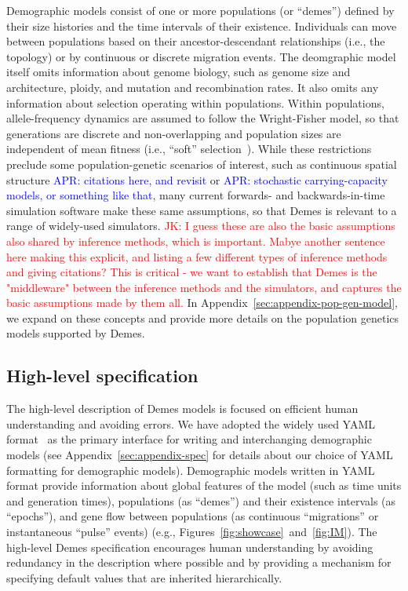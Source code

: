 \documentclass[11pt]{article}
\newcommand{\aprcomment}[1]{{\textcolor{blue}{APR: #1}}}
\newcommand{\jkcomment}[1]{{\textcolor{red}{JK: #1}}}
\begin{document}
Demographic models consist of one or more populations (or ``demes'') defined
by their size histories and the time intervals of their existence.
Individuals can move between populations based on their ancestor-descendant
relationships (i.e., the topology) or by continuous or discrete migration events.
The deomgraphic model itself omits information about genome biology, such as
genome size and architecture, ploidy, and mutation and recombination rates.
It also omits any information about selection operating within populations.
Within populations, allele-frequency dynamics are assumed to
follow the Wright-Fisher model, so that generations are discrete and
non-overlapping and population sizes are independent of mean fitness
(i.e., ``soft'' selection~\citep{christiansen1975hard}).
While these restrictions preclude some population-genetic scenarios of
interest, such as continuous spatial structure
\aprcomment{citations here, and revisit} or
\aprcomment{stochastic carrying-capacity models, or something like that},
many current forwards- and backwards-in-time simulation software
make these same assumptions, so that Demes is relevant to a range of
widely-used simulators.
\jkcomment{I guess these are also the basic assumptions also shared by
inference methods, which is important. Mabye another sentence here making this
explicit, and listing a few different types of inference methods and giving
citations? This is critical - we want to establish that Demes is the
"middleware" between the inference methods and the simulators, and captures the
basic assumptions made by them all.}
In Appendix~\ref{sec:appendix-pop-gen-model}, we expand on these concepts
and provide more details on the population genetics models supported by Demes.

\subsection*{High-level specification}

The high-level description of Demes models is focused on efficient human
understanding and avoiding errors.
We have adopted the widely used YAML format~\citep{ben2009yaml} as the
primary interface for writing and interchanging demographic models
(see Appendix~\ref{sec:appendix-spec} for details about our choice of
YAML formatting for demographic models).
Demographic models written in YAML format provide information about global
features of the model (such as time units and generation times),
populations (as ``demes'') and their existence intervals (as ``epochs''),
and gene flow between populations
(as continuous ``migrations'' or instantaneous ``pulse'' events)
(e.g., Figures~\ref{fig:showcase}~and~\ref{fig:IM}).
The high-level Demes specification encourages human understanding by avoiding
redundancy in the description where possible and by providing a mechanism for
specifying default values that are inherited hierarchically.
\end{document}
